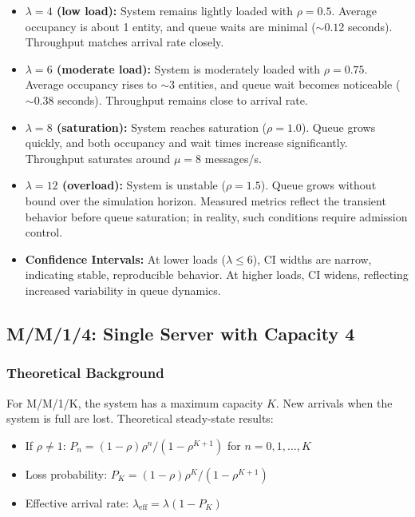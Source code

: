 \documentclass[12pt]{article}
\begin{document}
\begin{itemize}
    \item \textbf{$\lambda = 4$ (low load):} System remains lightly loaded with $\rho = 0.5$. Average occupancy is about 1 entity, and queue waits are minimal ($\sim 0.12$ seconds). Throughput matches arrival rate closely.

    \item \textbf{$\lambda = 6$ (moderate load):} System is moderately loaded with $\rho = 0.75$. Average occupancy rises to $\sim 3$ entities, and queue wait becomes noticeable ($\sim 0.38$ seconds). Throughput remains close to arrival rate.

    \item \textbf{$\lambda = 8$ (saturation):} System reaches saturation ($\rho = 1.0$). Queue grows quickly, and both occupancy and wait times increase significantly. Throughput saturates around $\mu = 8$ messages/s.

    \item \textbf{$\lambda = 12$ (overload):} System is unstable ($\rho = 1.5$). Queue grows without bound over the simulation horizon. Measured metrics reflect the transient behavior before queue saturation; in reality, such conditions require admission control.

    \item \textbf{Confidence Intervals:} At lower loads ($\lambda \le 6$), CI widths are narrow, indicating stable, reproducible behavior. At higher loads, CI widens, reflecting increased variability in queue dynamics.
\end{itemize}

\subsection{M/M/1/4: Single Server with Capacity 4}

\subsubsection{Theoretical Background}

For M/M/1/K, the system has a maximum capacity $K$. New arrivals when the system is full are lost. Theoretical steady-state results:

\begin{itemize}
    \item If $\rho \ne 1$: $P_n = (1-\rho) \rho^n / (1 - \rho^{K+1})$ for $n = 0, 1, \ldots, K$
    \item Loss probability: $P_K = (1-\rho) \rho^K / (1 - \rho^{K+1})$
    \item Effective arrival rate: $\lambda_{\text{eff}} = \lambda(1 - P_K)$
\end{itemize}
\end{document}
